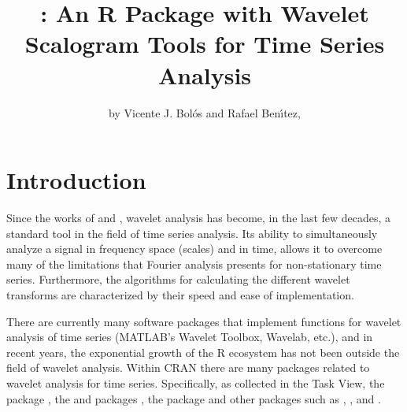 \title{: An R Package with Wavelet Scalogram Tools for Time Series Analysis}
\author{by Vicente J. Bol\'os and Rafael Ben\'{\i}tez, }

\maketitle


\section{Introduction}
Since the works of \citet{mal98} and \citet{dau92}, wavelet analysis has become, in the last  few decades, a standard tool in the  field of time series analysis. %
Its ability to simultaneously analyze a signal in frequency space (scales) and in time, allows it to overcome many of the limitations that Fourier analysis presents for non-stationary time series. Furthermore, the algorithms for calculating the different wavelet transforms are characterized by their speed and ease of implementation.

There are currently many software packages that implement functions for wavelet analysis of time series (MATLAB's  Wavelet Toolbox, Wavelab, etc.), and in recent years, the exponential growth of the R ecosystem has not been outside the field of wavelet analysis. Within CRAN there are many packages related to wavelet analysis for time series. Specifically, as collected in the  Task View, the  package \citep{wavelets} , the  and  packages \citep{WaveletComp, biwavelet} , the  package \citep{mvLSW}  and other packages such as  \citep{hwwntest},  \citep{rwt},   \citep{waveslim} and  \citep{wavethresh}.

